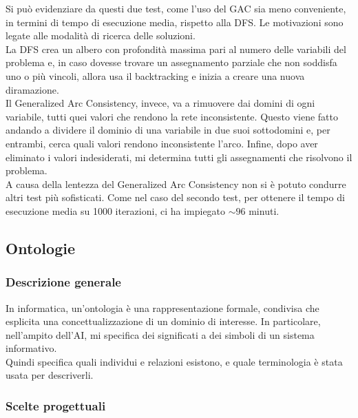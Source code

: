 \documentclass[12pt, letterpaper]{article}
\begin{document}
\noindent Si può evidenziare da questi due test, come l'uso del GAC sia meno conveniente, in termini
di tempo di esecuzione media, rispetto alla DFS. Le motivazioni sono legate alle modalità di ricerca delle soluzioni. \\

\noindent La DFS crea un albero con profondità massima pari al numero delle variabili del problema e, in
caso dovesse trovare un assegnamento parziale che non soddisfa uno o più vincoli, allora usa il
backtracking e inizia a creare una nuova diramazione. \\

\noindent Il Generalized Arc Consistency, invece, va a rimuovere dai domini di ogni variabile, tutti quei valori
che rendono la rete inconsistente. Questo viene fatto andando a dividere il dominio di una variabile in due suoi
sottodomini e, per entrambi, cerca quali valori rendono inconsistente l'arco.
Infine, dopo aver eliminato i valori indesiderati, mi determina tutti gli assegnamenti che risolvono il problema. \\

\noindent A causa della lentezza del Generalized Arc Consistency non si è
potuto condurre altri test più sofisticati. Come nel caso del secondo
test, per ottenere il tempo di esecuzione media su 1000 iterazioni, ci ha impiegato
$\sim96$ minuti.


\subsection{Ontologie}

\subsubsection{Descrizione generale}

In informatica, un'ontologia è una rappresentazione formale, condivisa che esplicita
una concettualizzazione di un dominio di interesse. In particolare, nell'ampito dell'AI,
mi specifica dei significati a dei simboli di un sistema informativo. \\

\noindent Quindi specifica quali individui e relazioni esistono, e quale
terminologia è stata usata per descriverli.


\subsubsection{Scelte progettuali}
\end{document}
